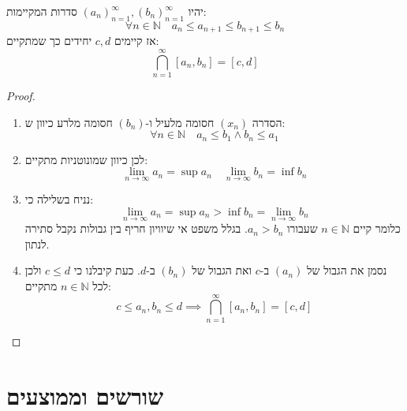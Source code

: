 \documentclass{tstextbook}
\begin{document}
\begin{proposition}
יהיו \((a_n)_{n=1}^\infty,(b_n)_{n=1}^\infty\) סדרות המקיימות:
$$\forall n \in \mathbb{N}\quad a_{n}\leq a_{n+1}\leq b_{n+1}\leq b_{n}$$
אז קיימים \(c,d\) יחידים כך שמתקיים:
$$\bigcap_{n=1}^{\infty} [a_{n},b_{n}]=[c,d]$$

\end{proposition}
\begin{proof}
  \begin{enumerate}
    \item הסדרה \((x_{n})\) חסומה מלעיל ו-\((b_{n})\) חסומה מלרע כיוון ש: 
$$\forall n \in \mathbb{N}\quad  a_{n}\leq b_{1}\land b_{n}\leq a_{1}$$


    \item לכן כיוון שמונוטניות מתקיים: 
$$\lim_{ n \to \infty } a_{n}=\sup a_{n}\quad \lim_{ n \to \infty }b_{n}=\inf b_{n} $$


    \item נניח בשלילה כי: 
$$\lim_{ n \to \infty } a_{n}=\sup a_{n}>\inf b_{n}=\lim_{ n \to \infty }b_{n}$$
כלומר קיים \(n \in \mathbb{N}\) שעבורו \(a_{n}> b_{n}\). בגלל משפט אי שיוויון חריף בין גבולות נקבל סתירה לנתון.


    \item נסמן את הגבול של \((a_{n})\) ב-\(c\) ואת הגבול של \((b_{n})\) ב-\(d\). כעת קיבלנו כי \(c\leq d\) ולכן לכל \(n \in \mathbb{N}\) מתקיים: 
$$c\leq a_{n},b_{n}\leq d\implies \bigcap_{n=1}^{\infty} [a_{n},b_{n}]=[c,d]$$


  \end{enumerate}
\end{proof}
\section{שורשים וממוצעים}
\end{document}
